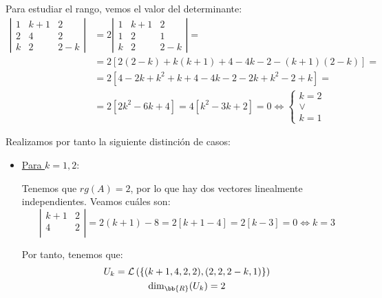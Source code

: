 \documentclass[12pt]{article}
\begin{document}
\begin{ejercicio}
\begin{enumerate}
        Para estudiar el rango, vemos el valor del determinante:
        \begin{equation*}\begin{split}
            \left|\begin{array}{ccc}
                1 & k+1 & 2 \\
                2 & 4 & 2 \\
                k & 2 & 2-k
            \end{array}\right|
            &= 2\left|\begin{array}{ccc}
                1 & k+1 & 2 \\
                1 & 2 & 1 \\
                k & 2 & 2-k
            \end{array}\right| =\\
            &= 2[2(2-k) +k(k+1) +4 - 4k -2 -(k+1)(2-k)] = \\
            &= 2[4-2k +k^2 +k+4-4k-2-2k+k^2 -2 +k] =\\
            &= 2[2k^2 -6k +4] = 4[k^2 -3k +2] = 0 \Longleftrightarrow
            \left\{\begin{array}{c}
                k=2 \\ \lor \\ k=1 
            \end{array}\right.
        \end{split}\end{equation*}

        Realizamos por tanto la siguiente distinción de casos:
        \begin{itemize}
            \item \underline{Para $k=1,2$}:

            Tenemos que $rg(A)=2$, por lo que hay dos vectores linealmente independientes. Veamos cuáles son:
            \begin{equation*}
                \left|\begin{array}{cc}
                k+1 & 2 \\
                4 & 2 \\
            \end{array}\right|
            = 2(k+1) -8 = 2[k+1-4] = 2[k-3] = 0 \Longleftrightarrow k=3
            \end{equation*}

            Por tanto, tenemos que:
            \begin{gather*}
                U_k = \mathcal{L}\left( \left\{ (k+1,4,2,2),(2,2,2-k,1) \right\}\right) \\
                \dim_{\bb{R}}(U_k)=2
            \end{gather*}


\end{itemize}
\end{enumerate}
\end{ejercicio}
\end{document}
